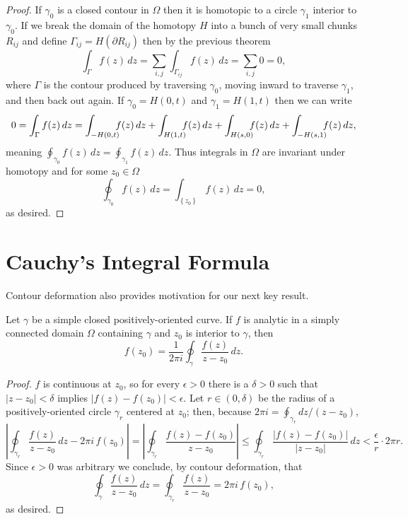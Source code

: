 \documentclass[../m136main.tex]{subfiles}
\begin{document}
\begin{proof}
    If $\gamma_0$ is a closed contour in $\Omega$ then it is homotopic to a circle $\gamma_1$ interior to $\gamma_0$.
    If we break the domain of the homotopy $H$ into a bunch of very small chunks $R_{ij}$ and define $\Gamma_{ij} = H(\partial R_{ij})$ then by the previous theorem
    \[ \int_{\Gamma} f(z) \,dz = \sum_{i,j}^{} \int_{\Gamma_{ij}} f(z) \,dz = \sum_{i,j}^{} 0 = 0, \]
    where $\Gamma$ is the contour produced by traversing $\gamma_0$, moving inward to traverse $\gamma_1$, and then back out again.
    If $\gamma_0 = H(0,t)$ and $\gamma_1 = H(1,t)$ then we can write
    \[ 0 = \int_\Gamma f(z) \,dz = \int_{-H(0,t)} \hspace{-6pt} f(z) \,dz + \int_{H(1,t)} \hspace{-6pt} f(z) \,dz + \int_{H(s,0)} \hspace{-6pt} f(z) \,dz + \int_{-H(s,1)} \hspace{-6pt} f(z) \,dz, \]
    meaning $\oint_{\gamma_0} f(z) \,dz = \oint_{\gamma_1} f(z) \,dz$.
    Thus integrals in $\Omega$ are invariant under homotopy and for some $z_0 \in \Omega$
    \[ \oint_{\gamma_0} f(z) \,dz = \int_{\left\{ z_0 \right\}} f(z) \,dz = 0, \]
    as desired.
\end{proof}

\section{Cauchy's Integral Formula}
Contour deformation also provides motivation for our next key result.

\begin{theorem}
    Let $\gamma$ be a simple closed positively-oriented curve.
    If $f$ is analytic in a simply connected domain $\Omega$ containing $\gamma$ and $z_0$ is interior to $\gamma$, then
    \[ f(z_0) = \frac{1}{2\pi i} \oint_\gamma \frac{f(z)}{z - z_0} \,dz. \]
\end{theorem}

\begin{proof}
    $f$ is continuous at $z_0$, so for every $\epsilon > 0$ there is a $\delta > 0$ such that $|z - z_0| < \delta$ implies $|f(z) - f(z_0)| < \epsilon$.
    Let $r \in (0, \delta)$ be the radius of a positively-oriented circle $\gamma_r$ centered at $z_0$; then, because $2\pi i = \oint_{\gamma_r} dz / (z - z_0)$,
    \[ \left| \oint_{\gamma_r} \frac{f(z)}{z - z_0} \,dz - 2\pi i \,f(z_0) \right| = \left| \oint_{\gamma_r} \frac{f(z) - f(z_0)}{z - z_0} \right| \leq \oint_{\gamma_r} \frac{|f(z) - f(z_0)|}{|z - z_0|} \,dz < \frac{\epsilon}{r} \cdot 2\pi r. \]
    Since $\epsilon > 0$ was arbitrary we conclude, by contour deformation, that
    \[ \oint_\gamma \frac{f(z)}{z - z_0} \,dz = \oint_{\gamma_r} \frac{f(z)}{z - z_0} = 2\pi i \,f(z_0), \]
    as desired.
\end{proof}
\end{document}
